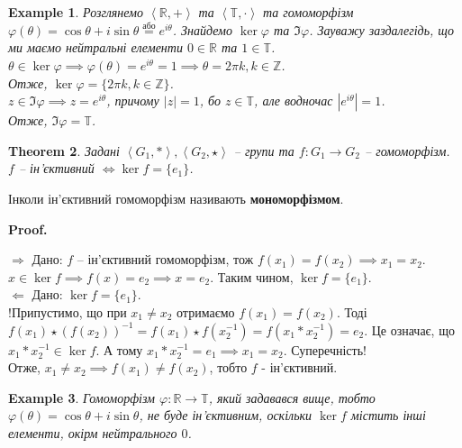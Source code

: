 \documentclass[a4paper, 10pt]{article}
\makeatletter
\def\rightproof{$\boxed{\Rightarrow}$ }
\def\leftproof{$\boxed{\Leftarrow}$ }
\theoremstyle{theoremdd}
\newtheorem{theorem}{Theorem}[subsection]
\theoremstyle{theoremdd}
\theoremstyle{theoremdd}
\theoremstyle{theoremdd}
\theoremstyle{theoremdd}
\newtheorem{example}[theorem]{Example}
\theoremstyle{theoremdd}
\theoremstyle{theoremdd}
\theoremstyle{theoremdd}
\theoremstyle{theoremdd}
\theoremstyle{theoremdd}
\theoremstyle{theoremdd}
\theoremstyle{theoremdd}
\theoremstyle{theoremdd}
\theoremstyle{theoremdd}
\theoremstyle{theoremdd}
\renewenvironment{proof}[1][Proof.\\]{\par
\pushQED{\hfill \qed}%
\normalfont \topsep6\p@\@plus6\p@\relax
\trivlist
\item\relax
{\bfseries
#1\@addpunct{.}}\hspace\labelsep\ignorespaces
}{%
\popQED\endtrivlist\@endpefalse
}
\makeatother
\begin{document}
\begin{example}
Розглянемо $\left<\mathbb{R},+\right>$ та $\left<\mathbb{T},\cdot \right>$ та гомоморфізм $\varphi(\theta) = \cos \theta + i \sin \theta \overset{\text{або}}{=} e^{i\theta}$. Знайдемо $\ker \varphi$ та $\Im \varphi$. Зауважу заздалегідь, що ми маємо нейтральні елементи $0 \in \mathbb{R}$ та $1 \in \mathbb{T}$.\\
$\theta \in \ker \varphi \implies \varphi(\theta) = e^{i \theta} = 1 \implies \theta = 2 \pi k, k \in \mathbb{Z}$.\\
Отже, $\ker \varphi = \{2 \pi k, k \in \mathbb{Z}\}$.\\
$z \in \Im \varphi \implies z = e^{i \theta}$, причому $|z| = 1$, бо $z \in \mathbb{T}$, але водночас $|e^{i\theta}| = 1$.\\
Отже, $\Im \varphi = \mathbb{T}$.
\end{example}

\begin{theorem}
Задані $\left<G_1, * \right>,\left<G_2, \star \right>$ -- групи та $f \colon G_1 \to G_2$ -- гомоморфізм.\\
$f$ -- ін'єктивний $\iff \ker f = \{e_1\}$.
\end{theorem}
Інколи ін'єктивний гомоморфізм називають \textbf{мономорфізмом}.

\begin{proof}
\rightproof Дано: $f$ -- ін'єктивний гомоморфізм, тож $f(x_1) = f(x_2) \implies x_1 = x_2$.\\
$x \in \ker f \implies f(x) = e_2 \implies x = e_2$. Таким чином, $\ker f = \{e_1\}$.
\bigskip \\
\leftproof Дано: $\ker f = \{e_1\}$.\\
!Припустимо, що при $x_1 \neq x_2$ отримаємо $f(x_1) = f(x_2)$. Тоді $f(x_1)\star(f(x_2))^{-1} = f(x_1) \star f(x_2^{-1}) = f(x_1 * x_2^{-1}) = e_2$.
Це означає, що $x_1*x_2^{-1} \in \ker f$. А тому $x_1*x_2^{-1} = e_1 \implies x_1 = x_2$. Суперечність!\\
Отже, $x_1 \neq x_2 \implies f(x_1) \neq f(x_2)$, тобто $f$ - ін'єктивний.
\end{proof}

\begin{example}
Гомоморфізм $\varphi \colon \mathbb{R} \to \mathbb{T}$, який задавався вище, тобто $\varphi(\theta) = \cos \theta + i \sin \theta$, не буде ін'єктивним, оскільки $\ker f$ містить інші елементи, окірм нейтрального $0$.
\end{example}
\end{document}

